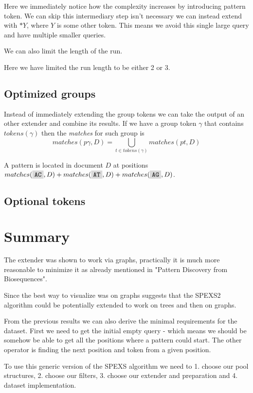 \begin{figure}[H]
	
\end{figure}

Here we immediately notice how the complexity increases by introducing pattern token.  We can skip this intermediary step isn't necessary we can instead extend with $*Y$, where $Y$ is some other token. This means we avoid this single large query and have multiple smaller queries.

\begin{figure}[H]
	
\end{figure}

We can also limit the length of the run.

\begin{figure}[H]
	
\end{figure}

Here we have limited the run length to be either 2 or 3.

\subsection{Optimized groups}

Instead of immediately extending the group tokens we can take the output of an other extender and combine its results. If we have a group token $\gamma$ that contains $tokens(\gamma)$ then the \emph{matches} for such group is $$matches(p\gamma, D) = \bigcup_{t \in tokens(\gamma)} matches(pt, D) $$

\begin{exmp}
A pattern  is located in document $D$ at positions $matches(\R{AC}, D) + matches(\R{AT}, D) + matches(\R{AG}, D)$.
\end{exmp}


\subsection{Optional tokens}


\section{Summary}

The extender was shown to work via graphs, practically it is much more reasonable to minimize it as already mentioned in "Pattern Discovery from Biosequences"\cite{spexs}.

Since the best way to visualize was on graphs suggests that the SPEXS2 algorithm could be potentially extended to work on trees and then on graphs.

From the previous results we can also derive the minimal requirements for the dataset. First we need to get the initial empty query - which means we should be somehow be able to get all the positions where a pattern could start. The other operator is finding the next position and token from a given position.

To use this generic version of the SPEXS algorithm we need to 1. choose our pool structures, 2. choose our filters, 3. choose our extender and preparation and 4. dataset implementation.
